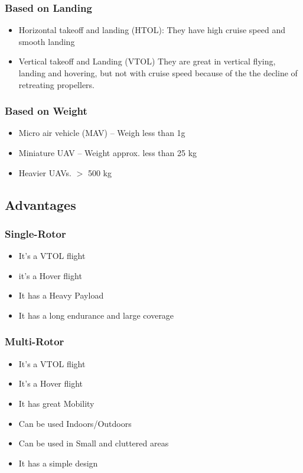 \documentclass[11pt,twocolumn,letterpaper]{article}
\begin{document}
\subsubsection{Based on Landing}
\begin{itemize}
\item Horizontal takeoff and landing (HTOL):
 They have high cruise speed and smooth landing
\item Vertical takeoff and Landing (VTOL)
They are great in vertical flying, landing and hovering, but not with cruise
speed because of the the decline of retreating propellers.
\end{itemize}

\subsubsection{Based on Weight}
\begin{itemize}
\item Micro air vehicle (MAV) – Weigh less than 1g
\item Miniature UAV – Weight approx. less than 25 kg
\item Heavier UAVs. $>$ 500 kg
\end{itemize}


\subsection{Advantages}
\subsubsection{Single-Rotor}
\begin{itemize}
\item It's a VTOL flight
\item it's a Hover flight
\item It has a Heavy Payload
\item It has a long endurance and large coverage
\end{itemize}

\subsubsection{Multi-Rotor}
\begin{itemize}
\item It's a VTOL flight
\item It's a Hover flight
\item It has great Mobility
\item Can be used Indoors/Outdoors
\item Can be used in Small and cluttered areas
\item It has a simple design
\end{itemize}
\end{document}
